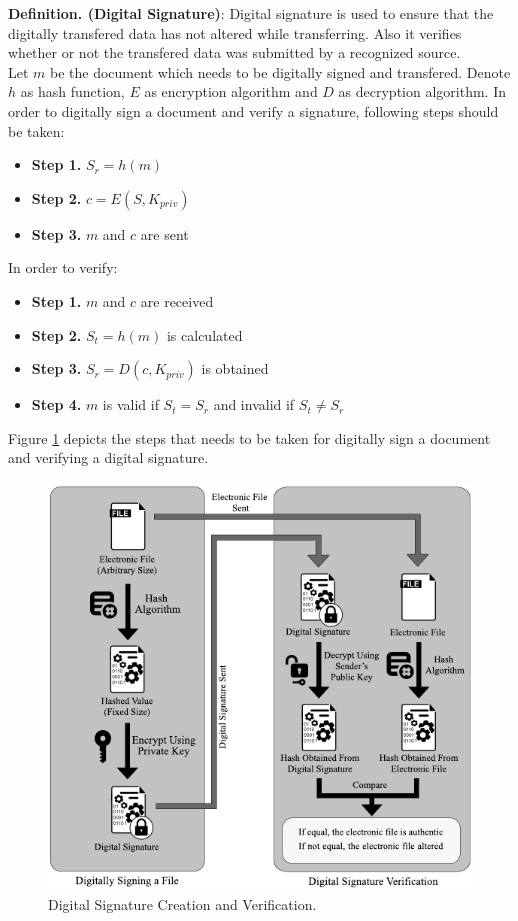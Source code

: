 \textbf{Definition. (Digital Signature)}: Digital signature is used to ensure that the digitally transfered data has not altered while transferring. Also it verifies whether or not the transfered data was submitted by a recognized source. \\
Let $m$ be the document which needs to be digitally signed and transfered. Denote $h$ as hash function, $E$ as encryption algorithm and $D$ as decryption algorithm. In order to digitally sign a document and verify a signature, following steps should be taken:
\begin{itemize}
	\item \textbf{Step 1.} $S_r = h(m)$
	\item \textbf{Step 2.} $c = E(S,K_{priv})$
	\item \textbf{Step 3.} $m$ and $c$ are sent
\end{itemize}
In order to verify:
\begin{itemize}
	\item \textbf{Step 1.} $m$ and $c$ are received
	\item \textbf{Step 2.} $S_t = h(m)$ is calculated
	\item \textbf{Step 3.} $S_r = D(c,K_{priv})$ is obtained
	\item \textbf{Step 4.} $m$ is valid if $S_t = S_r$ and invalid if $S_t \neq S_r$
\end{itemize}
Figure \ref{fig:DigitalSignature} depicts the steps that needs to be taken for digitally sign a document and verifying a digital signature.\\
\begin{figure}
	\label{fig:DigitalSignature}
	\centering
	\includegraphics[width=\textwidth]{figs/digital_signature.pdf}
	\caption{Digital Signature Creation and Verification.}
\end{figure}
